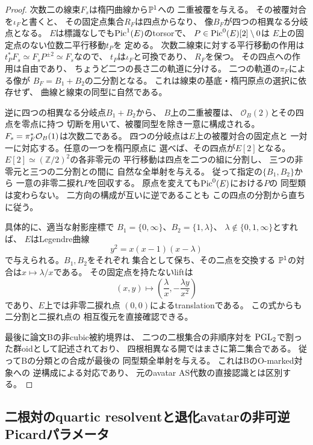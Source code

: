 \begin{proof}
次数二の線束$F_s$は楕円曲線から$\mathbb P^1$への
二重被覆を与える。
その被覆対合を$\iota_F$と書くと、
その固定点集合$R_F$は四点からなり、
像$B_F$が四つの相異なる分岐点となる。
$E$は標識なしでも$\operatorname{Pic}^1(E)$のtorsorで、
$P\in\operatorname{Pic}^0(E)[2]\setminus0$は
$E$上の固定点のない位数二平行移動$t_P$を
定める。
次数二線束に対する平行移動の作用は
$t_P^*F_s\simeq F_sP^{\pm2}\simeq F_s$なので、
$t_P$は$\iota_F$と可換であり、
$R_F$を保つ。
その四点への作用は自由であり、
ちょうど二つの長さ二の軌道に分ける。
二つの軌道の$\pi_F$による像が
$B_F=B_1+B_2$の二分割となる。
これは線束の基底・楕円原点の選択に依存せず、
曲線と線束の同型に自然である。

逆に四つの相異なる分岐点$B_1+B_2$から、
$B$上の二重被覆は、
$\mathcal O_B(2)$とその四点を零点に持つ
切断を用いて、被覆同型を除き一意に構成される。
$F_s=\pi_F^*\mathcal O_B(1)$は次数二である。
四つの分岐点は$E$上の被覆対合の固定点と
一対一に対応する。任意の一つを楕円原点に
選べば、その四点が$E[2]$となる。
$E[2]\simeq(\mathbb Z/2)^2$の各非零元の
平行移動は四点を二つの組に分割し、
三つの非零元と三つの二分割との間に
自然な全単射を与える。
従って指定の$\{B_1,B_2\}$から
一意の非零二捩れ$P$を回収する。
原点を変えても$\operatorname{Pic}^0(E)$における$P$の
同型類は変わらない。
二方向の構成が互いに逆であることも
この四点の分割から直ちに従う。

具体的に、適当な射影座標で
$B_1=\{0,\infty\}$、$B_2=\{1,\lambda\}$、
$\lambda\notin\{0,1,\infty\}$とすれば、
$E$はLegendre曲線
\[
 y^2=x(x-1)(x-\lambda)
\]
で与えられる。$B_1,B_2$をそれぞれ
集合として保ち、その二点を交換する
$\mathbb P^1$の対合は$x\mapsto\lambda/x$である。
その固定点を持たないliftは
\[
 (x,y)\longmapsto
 \left(\frac{\lambda}{x},
             -\frac{\lambda y}{x^2}\right)
 \tag{Root-2}\label{eq:qa-avatar-root-pair-translation}
\]
であり、$E$上では非零二捩れ点
$(0,0)$によるtranslationである。
この式からも二分割と二捩れ点の
相互復元を直接確認できる。

最後に論文Bの非cubic被約境界は、
二つの二根集合の非順序対を
$\operatorname{PGL}_2$で割った群oidとして記述されており、
四根相異なる開ではまさに第二集合である。
従ってBの分類との合成が最後の
同型類全単射を与える。
これはBのO-marked対象への
逆構成による対応であり、
元のavatar AS代数の直接認識とは区別する。
\end{proof}

\subsection{二根対のquartic resolventと退化avatarの非可逆Picardパラメータ}
\label{subsec:qa-rootpair-resolvent-singular-avatar}

